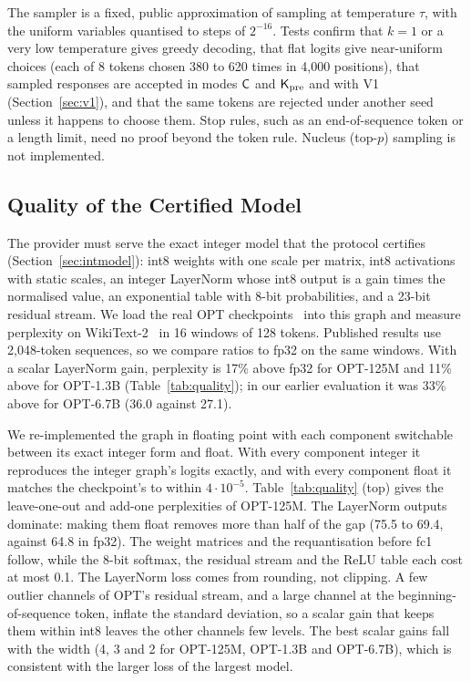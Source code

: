  The sampler is a fixed, public approximation of sampling at
temperature $\tau$, with the uniform variables quantised to steps of $2^{-16}$.  Tests confirm that $k=1$ or a very low temperature gives greedy decoding,
that flat logits give near-uniform choices (each of 8 tokens chosen 380 to 620 times in 4{,}000
positions), that sampled responses are accepted in modes $\mathsf{C}$ and $\mathsf{K}_{\mathrm{pre}}$ and with V1
(Section~\ref{sec:v1}), and that the same tokens are rejected under another seed unless it
happens to choose them. Stop rules, such as an end-of-sequence token or a length limit, need no
proof beyond the token rule. Nucleus
(top-$p$) sampling is not implemented. 

\subsection{Quality of the Certified Model}
\label{sec:quality}

The provider must serve the exact integer model that the protocol certifies
(Section~\ref{sec:intmodel}): int8 weights with
one scale per matrix, int8 activations with static scales, an integer LayerNorm whose int8 output
is a gain times the normalised value, an exponential table with 8-bit probabilities, and a 23-bit
residual stream. We load the real OPT checkpoints~\cite{zhang2022opt} into this graph and measure
perplexity on WikiText-2~\cite{merity2017wikitext} in 16 windows of 128 tokens. Published results
use 2{,}048-token sequences, so we compare ratios to fp32 on the same windows. With a scalar
LayerNorm gain, perplexity is 17\% above fp32 for OPT-125M and 11\% above for OPT-1.3B
(Table~\ref{tab:quality}); in our earlier evaluation it was 33\% above for OPT-6.7B (36.0 against
27.1).

 We re-implemented the graph in floating point with each
component switchable between its exact integer form and float. With every component integer it
reproduces the integer graph's logits exactly, and with every component float it matches the
checkpoint's to within $4\cdot10^{-5}$. Table~\ref{tab:quality} (top) gives the leave-one-out and
add-one perplexities of OPT-125M. The LayerNorm outputs dominate: making them float removes more
than half of the gap (75.5 to 69.4, against 64.8 in fp32). The weight matrices and the requantisation before fc1 follow, while the
8-bit softmax, the residual stream and the ReLU table each cost at most 0.1. The LayerNorm loss
comes from rounding, not clipping. A few outlier channels of OPT's residual stream, and a large
channel at the beginning-of-sequence token, inflate the standard deviation, so a scalar gain that
keeps them within int8 leaves the other channels few levels. The best scalar gains fall with the
width (4, 3 and 2 for OPT-125M, OPT-1.3B and OPT-6.7B), which is consistent with the larger loss
of the largest model.

